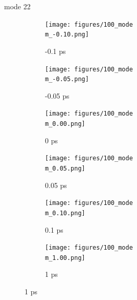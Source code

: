 \documentclass{beamer}
\newcommand\w{0.32}
\begin{document}
\renewcommand\m{22}
\begin{frame}{mode \m}
	\begin{figure}
		\centering
		\begin{subfigure}[b]{\w\textwidth}
			\centering
			\texttt{[image: figures/100\_mode\\m\_-0.10.png]}
			\caption{-0.1 ps}
		\end{subfigure}
		\begin{subfigure}[b]{\w\textwidth}
			\centering
			\texttt{[image: figures/100\_mode\\m\_-0.05.png]}
			\caption{-0.05 ps}
		\end{subfigure}
		\begin{subfigure}[b]{\w\textwidth}
			\centering
			\texttt{[image: figures/100\_mode\\m\_0.00.png]}
			\caption{0 ps}
		\end{subfigure}
		\begin{subfigure}[b]{\w\textwidth}
			\centering
			\texttt{[image: figures/100\_mode\\m\_0.05.png]}
			\caption{0.05 ps}
		\end{subfigure}
		\begin{subfigure}[b]{\w\textwidth}
			\centering
			\texttt{[image: figures/100\_mode\\m\_0.10.png]}
			\caption{0.1 ps}
		\end{subfigure}
		\begin{subfigure}[b]{\w\textwidth}
			\centering
			\texttt{[image: figures/100\_mode\\m\_1.00.png]}
			\caption{1 ps}
		\end{subfigure}
	\end{figure}
\end{frame}
\end{document}
